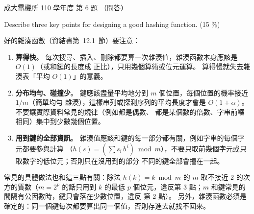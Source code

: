 \begin{pastexam}[label={px:ncku-110-ee-ds-06}]{成大電機所 110 學年度 第 6 題}
（問答）

Describe three key points for designing a good hashing function. \hfill (15 \%)
\end{pastexam}

\begin{pastsoln}
好的雜湊函數（資結書第~12.1~節）要注意：

\begin{enumerate}
\item \textbf{算得快}。 每次搜尋、插入、刪除都要算一次雜湊值，雜湊函數本身應該是 $O(1)$（或和鍵的長度成
正比），只用幾個算術或位元運算。 算得慢就失去雜湊表「平均 $O(1)$」的意義。
\item \textbf{分布均勻、碰撞少}。 鍵應該盡量平均地分到 $m$ 個位置，每個位置的機率接近 $1/m$（簡單均勻
雜湊），這樣串列或探測序列的平均長度才會是 $O(1 + \alpha)$。 不要讓實際資料常見的規律（例如都是偶數、
都是某個數的倍數、字串前綴相同）集中到少數幾個位置。
\item \textbf{用到鍵的全部資訊}。 雜湊值應該和鍵的每一部分都有關，例如字串的每個字元都要參與計算
（$h(s) = (\sum s_i\, b^{\,i}) \bmod m$），不要只取前幾個字元或只取數字的低位元；否則只在沒用到的部分
不同的鍵全部會撞在一起。
\end{enumerate}

常見的具體做法也和這三點有關：除法 $h(k) = k \bmod m$ 的 $m$ 取不接近 $2$ 的次方的質數（$m = 2^p$
的話只用到 $k$ 的最低 $p$ 個位元，違反第 3 點；$m$ 和鍵常見的間隔有公因數時，鍵只會落在少數位置，違反
第 2 點）。 另外，雜湊函數必須是確定的：同一個鍵每次都要算出同一個值，否則存進去就找不回來。
\end{pastsoln}
